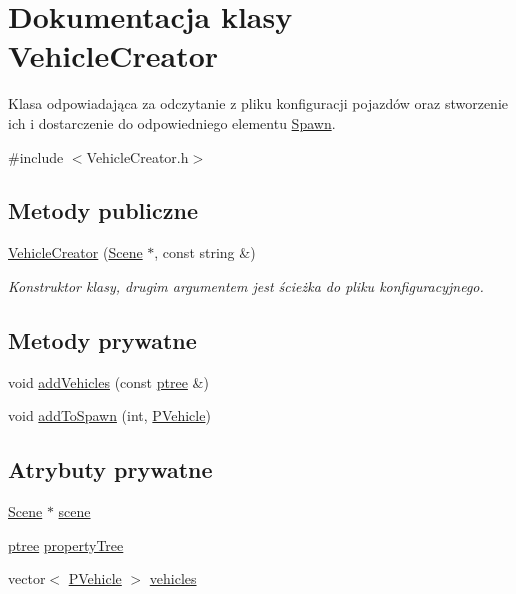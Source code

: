 \hypertarget{class_vehicle_creator}{\section{Dokumentacja klasy Vehicle\-Creator}
\label{class_vehicle_creator}
}


Klasa odpowiadająca za odczytanie z pliku konfiguracji pojazdów oraz stworzenie ich i dostarczenie do odpowiedniego elementu \hyperlink{class_spawn}{Spawn}.  




{\ttfamily \#include $<$Vehicle\-Creator.\-h$>$}

\subsection*{Metody publiczne}
\begin{DoxyCompactItemize}
\item 
\hyperlink{class_vehicle_creator_a174fc1d2c051f86582ea84f8fc7acebb}{Vehicle\-Creator} (\hyperlink{class_scene}{Scene} $\ast$, const string \&)
\begin{DoxyCompactList}\small\item\em Konstruktor klasy, drugim argumentem jest ścieżka do pliku konfiguracyjnego. \end{DoxyCompactList}\end{DoxyCompactItemize}
\subsection*{Metody prywatne}
\begin{DoxyCompactItemize}
\item 
void \hyperlink{class_vehicle_creator_ab8145c81021566539a6ae95dc717e415}{add\-Vehicles} (const \hyperlink{_map_factory_8h_a54a98738cc1e3485f2cf5f24979317e5}{ptree} \&)
\item 
void \hyperlink{class_vehicle_creator_a420358012f0f6c22893cf8ee5adee14d}{add\-To\-Spawn} (int, \hyperlink{_types_8h_a564207d327881e8bcfa0843e1a874756}{P\-Vehicle})
\end{DoxyCompactItemize}
\subsection*{Atrybuty prywatne}
\begin{DoxyCompactItemize}
\item 
\hyperlink{class_scene}{Scene} $\ast$ \hyperlink{class_vehicle_creator_a53e33d385593f7473da5afa14715e569}{scene}
\item 
\hyperlink{_map_factory_8h_a54a98738cc1e3485f2cf5f24979317e5}{ptree} \hyperlink{class_vehicle_creator_aa9ad6fb2dc9ff1b715196ae914c6925e}{property\-Tree}
\item 
vector$<$ \hyperlink{_types_8h_a564207d327881e8bcfa0843e1a874756}{P\-Vehicle} $>$ \hyperlink{class_vehicle_creator_a7cd2f07f6b6d9a8299bd2c6b5657f292}{vehicles}
\end{DoxyCompactItemize}


